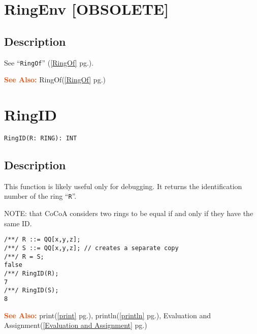 \documentclass[a4paper]{mybook}
\newenvironment{command}{}{} %
\newcommand\SeeAlso{\par\textcolor{OrangeRed}{\textbf{\large See Also: }}}
\begin{document}
\section{RingEnv [OBSOLETE]}
\label{RingEnv [OBSOLETE]}
\begin{command} %



\subsection*{Description}

See ``\verb&RingOf&'' (\ref{RingOf} pg.\pageref{RingOf}).

\SeeAlso %
  RingOf(\ref{RingOf} pg.\pageref{RingOf})
\end{command} %

\section{RingID}
\label{RingID}
\begin{command} %


\begin{Verbatim}[label=syntax, rulecolor=\color{MidnightBlue},
frame=single]
RingID(R: RING): INT
\end{Verbatim}


\subsection*{Description}

This function is likely useful only for debugging.  It returns the
identification number of the ring ``\verb&R&''.
\par 
NOTE: that CoCoA considers two rings to be equal if and only if they
have the same ID.
\begin{Verbatim}[label=example, rulecolor=\color{PineGreen}, frame=single]
/**/ R ::= QQ[x,y,z];
/**/ S ::= QQ[x,y,z]; // creates a separate copy
/**/ R = S;
false
/**/ RingID(R);
7
/**/ RingID(S);
8
\end{Verbatim}


\SeeAlso %
  print(\ref{print} pg.\pageref{print}), 
    println(\ref{println} pg.\pageref{println}), 
    Evaluation and Assignment(\ref{Evaluation and Assignment} pg.\pageref{Evaluation and Assignment})
\end{command} %
\end{document}
